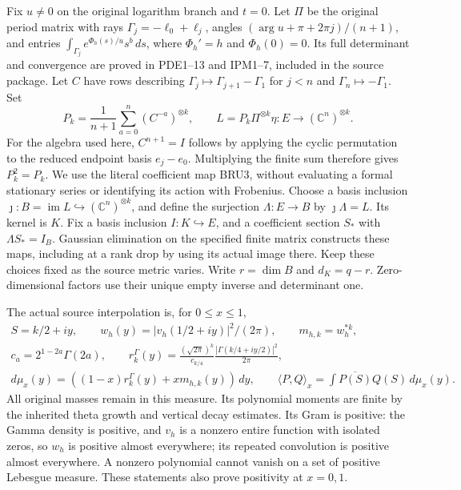 Fix $u\ne0$ on the original logarithm branch and $t=0$. Let
$\Pi$ be the original period matrix with rays
$\Gamma_j=-\ell_0+\ell_j$, angles
$(\arg u+\pi+2\pi j)/(n+1)$, and entries
$\int_{\Gamma_j}e^{\Phi_h(s)/u}s^b\,ds$, where $\Phi_h'=h$ and
$\Phi_h(0)=0$. Its full determinant and convergence are proved in
PDE1--13 and IPM1--7, included in the source package. Let $C$ have
rows describing $\Gamma_j\mapsto\Gamma_{j+1}-\Gamma_1$ for $j<n$
and $\Gamma_n\mapsto-\Gamma_1$. Set
\[
 P_k=\frac1{n+1}\sum_{a=0}^{n}(C^{-a})^{\otimes k},\qquad
 L=P_k\Pi^{\otimes k}\eta:E\longrightarrow(\mathbb{C}^n)^{\otimes k}.
 \tag{BRU3}
\]
For the algebra used here, $C^{n+1}=I$ follows by applying the
cyclic permutation to the reduced endpoint basis $e_j-e_0$.
Multiplying the finite sum therefore gives $P_k^2=P_k$.
We use the literal coefficient map BRU3, without evaluating a
formal stationary series or identifying its action with Frobenius.
Choose a basis inclusion $\jmath:B=\operatorname{im}L\hookrightarrow
(\mathbb{C}^n)^{\otimes k}$, and define the surjection
$\Lambda:E\to B$ by $\jmath\Lambda=L$. Its kernel is $K$.
Fix a basis inclusion $I:K\hookrightarrow E$, and a coefficient
section $S_*$ with $\Lambda S_*=I_B$. Gaussian elimination on the
specified finite matrix constructs these maps, including at a
rank drop by using its actual image there. Keep these choices fixed
as the source metric varies. Write $r=\dim B$ and $d_K=q-r$.
Zero-dimensional factors use their unique empty inverse and determinant one.

The actual source interpolation is, for $0\leq x\leq1$,
\[
 \begin{gathered}
 S=k/2+iy,\qquad w_h(y)=|v_h(1/2+iy)|^2/(2\pi),\qquad
 m_{h,k}=w_h^{*k},\\
 c_a=2^{1-2a}\Gamma(2a),\qquad
 r_k^\Gamma(y)=\frac{(\sqrt{2\pi})^k}{c_{k/4}}
                   \frac{|\Gamma(k/4+iy/2)|^2}{2\pi},\\
 d\mu_x(y)=((1-x)r_k^\Gamma(y)+xm_{h,k}(y))\,dy,\qquad
 \langle P,Q\rangle_x=\int\overline{P(S)}Q(S)\,d\mu_x(y).
 \end{gathered}\tag{BRU4}
\]
All original masses remain in this measure. Its polynomial moments
are finite by the inherited theta growth and vertical decay estimates.
Its Gram is positive: the Gamma density is positive, and $v_h$ is
a nonzero entire function with isolated zeros, so $w_h$ is positive
almost everywhere; its repeated convolution is positive almost
everywhere. A nonzero polynomial cannot vanish on a set of positive
Lebesgue measure. These statements also prove positivity at $x=0,1$.

